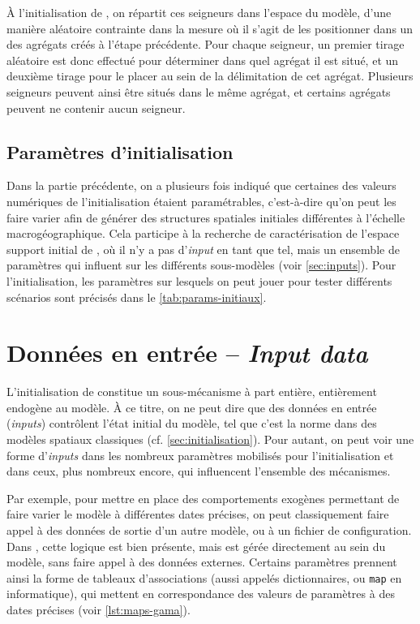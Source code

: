 À l'initialisation de \simfeodal{}, on répartit ces seigneurs dans l'espace du modèle, d'une manière aléatoire contrainte dans la mesure où il s'agit de les positionner dans un des agrégats créés à l'étape précédente.
Pour chaque seigneur, un premier tirage aléatoire est donc effectué pour déterminer dans quel agrégat il est situé, et un deuxième tirage pour le placer au sein de la délimitation de cet agrégat.
Plusieurs seigneurs peuvent ainsi être situés dans le même agrégat, et certains agrégats peuvent ne contenir aucun seigneur.

\subsection{Paramètres d'initialisation}
Dans la partie précédente, on a plusieurs fois indiqué que certaines des valeurs numériques de l'initialisation étaient paramétrables, c'est-à-dire qu'on peut les faire varier afin de générer des structures spatiales initiales différentes à l'échelle macrogéographique.
Cela participe à la recherche de caractérisation de l'espace support initial de \simfeodal{}, où il n'y a pas d'\og \textit{input}\fg{} en tant que tel, mais un ensemble de paramètres qui influent sur les différents sous-modèles (voir \cref{sec:inputs}).
Pour l'initialisation, les paramètres sur lesquels on peut jouer pour tester différents scénarios sont précisés dans le \cref{tab:params-initiaux}.

\clearpage


\let\orisectionmark\sectionmark
\renewcommand\sectionmark[1]{}%
\section[Données en entrée -- \textit{Input data}]{Données en entrée -- \large{\textit{Input data}} \label{sec:inputs}}
\orisectionmark{Données en entrée}
\let\sectionmark\orisectionmark

L'initialisation de \simfeodal{} constitue un sous-mécanisme à part entière, entièrement endogène au modèle.
À ce titre, on ne peut dire que des données en entrée (\textit{inputs}) contrôlent l'état initial du modèle, tel que c'est la norme dans des modèles spatiaux classiques (cf. \cref{sec:initialisation}).
Pour autant, on peut voir une forme d'\textit{inputs} dans les nombreux paramètres mobilisés pour l'initialisation et dans ceux, plus nombreux encore, qui influencent l'ensemble des mécanismes.

Par exemple, pour mettre en place des comportements exogènes permettant de faire varier le modèle à différentes dates précises, on peut classiquement faire appel à des données de sortie d'un autre modèle, ou à un fichier de configuration.
Dans \simfeodal{}, cette logique est bien présente, mais est gérée directement au sein du modèle, sans faire appel à des données externes.
Certains paramètres prennent ainsi la forme de tableaux d'associations (aussi appelés dictionnaires, ou \og \texttt{map}\fg{} en informatique), qui mettent en correspondance des valeurs de paramètres à des dates précises (voir \cref{lst:maps-gama}).
\medskip

